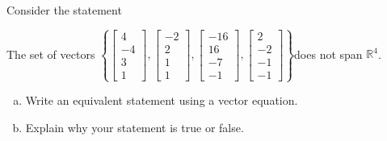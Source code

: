 
\begin{exerciseStatement}


Consider the statement 
\begin{center}\begin{minipage}{0.8\textwidth}
 The set of vectors \( \left\{ \left[\begin{array}{c}
4 \\
-4 \\
3 \\
1
\end{array}\right] , \left[\begin{array}{c}
-2 \\
2 \\
1 \\
1
\end{array}\right] , \left[\begin{array}{c}
-16 \\
16 \\
-7 \\
-1
\end{array}\right] , \left[\begin{array}{c}
2 \\
-2 \\
-1 \\
-1
\end{array}\right] \right\} \)does not span \(\mathbb{R}^4\). 
\end{minipage}\end{center}
    


\begin{enumerate}[(a)]
\item  Write an equivalent statement using a vector equation.
\item  Explain why your statement is true or false.
\end{enumerate}
    
\end{exerciseStatement}
    

